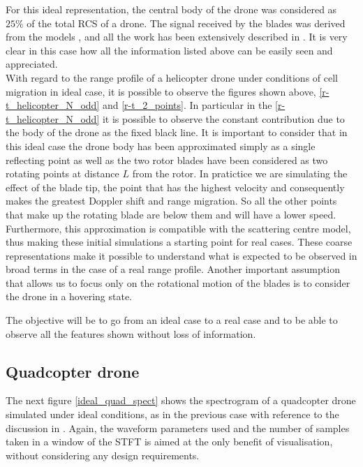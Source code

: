 For this ideal representation, the central body of the drone was considered as $25\%$ of the total RCS of a drone. The signal received by the blades was derived from the models \cite{kulpa}, \cite{microdoppler_chen} and all the work has been extensively described in \cite{tesiligresti}. It is very clear in this case how all the information listed above can be easily seen and appreciated.\\
With regard to the range profile of a helicopter drone under conditions of cell migration in ideal case, it is possible to observe the figures shown above, \ref{r-t_helicopter_N_odd} and \ref{r-t_2_points}. In particular in the \ref{r-t_helicopter_N_odd} it is possible to observe the constant contribution due to the body of the drone as the fixed black line. 
It is important to consider that in this ideal case the drone body has been approximated simply as a single reflecting point as well as the two rotor blades have been considered as two rotating points at distance $L$ from the rotor. In pratictice we are simulating the effect of the blade tip, the point that has the highest velocity and consequently makes the greatest Doppler shift and range migration. So all the other points that make up the rotating blade are below them and will have a lower speed. Furthermore, this approximation is compatible with the scattering centre model, thus making these initial simulations a starting point for real cases. These coarse representations make it possible to understand what is expected to be observed in broad terms in the case of a real range profile.
Another important assumption that allows us to focus only on the rotational motion of the blades is to consider the drone in a hovering state.

The objective will be to go from an ideal case to a real case and to be able to observe all the features shown without loss of information.

\subsection{Quadcopter drone}
The next figure \ref{ideal_quad_spect} shows the spectrogram of a quadcopter drone simulated under ideal conditions, as in the previous case with reference to the discussion in \cite{tesiligresti}. Again, the waveform parameters used and the number of samples taken in a window of the STFT is aimed at the only benefit of visualisation, without considering any design requirements.

